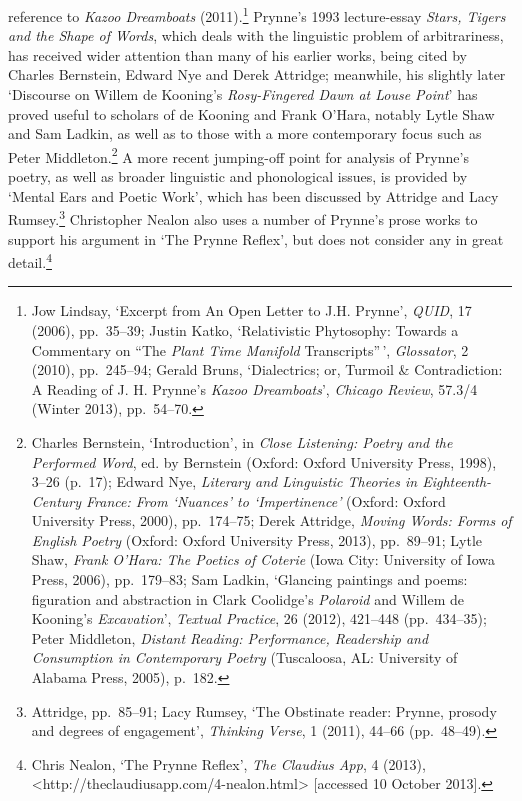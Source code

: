 \documentclass[]{article}
\begin{document}
reference to \emph{Kazoo Dreamboats} (2011).\footnote{Jow Lindsay,
  `Excerpt from An Open Letter to J.H. Prynne', \emph{QUID}, 17 (2006),
  pp.~35--39; Justin Katko, `Relativistic Phytosophy: Towards a
  Commentary on ``The \emph{Plant Time Manifold} Transcripts''\,',
  \emph{Glossator}, 2 (2010), pp.~245--94; Gerald Bruns, `Dialectrics;
  or, Turmoil \& Contradiction: A Reading of J. H. Prynne's \emph{Kazoo
  Dreamboats}', \emph{Chicago Review}, 57.3/4 (Winter 2013), pp.~54--70.}
Prynne's 1993 lecture-essay \emph{Stars, Tigers and the Shape of Words},
which deals with the linguistic problem of arbitrariness, has received
wider attention than many of his earlier works, being cited by Charles
Bernstein, Edward Nye and Derek Attridge; meanwhile, his slightly later
`Discourse on Willem de Kooning's \emph{Rosy-Fingered Dawn at Louse
Point}' has proved useful to scholars of de Kooning and Frank O'Hara,
notably Lytle Shaw and Sam Ladkin, as well as to those with a more
contemporary focus such as Peter Middleton.\footnote{Charles Bernstein,
  `Introduction', in \emph{Close Listening: Poetry and the Performed
  Word}, ed. by Bernstein (Oxford: Oxford University Press, 1998), 3--26
  (p.~17); Edward Nye, \emph{Literary and Linguistic Theories in
  Eighteenth-Century France: From `Nuances' to `Impertinence'} (Oxford:
  Oxford University Press, 2000), pp.~174--75; Derek Attridge,
  \emph{Moving Words: Forms of English Poetry} (Oxford: Oxford
  University Press, 2013), pp.~89--91; Lytle Shaw, \emph{Frank O'Hara:
  The Poetics of Coterie} (Iowa City: University of Iowa Press, 2006),
  pp.~179--83; Sam Ladkin, `Glancing paintings and poems: figuration and
  abstraction in Clark Coolidge's \emph{Polaroid} and Willem de
  Kooning's \emph{Excavation}', \emph{Textual Practice}, 26 (2012),
  421--448 (pp.~434--35); Peter Middleton, \emph{Distant Reading:
  Performance, Readership and Consumption in Contemporary Poetry}
  (Tuscaloosa, AL: University of Alabama Press, 2005), p.~182.} A more
recent jumping-off point for analysis of Prynne's poetry, as well as
broader linguistic and phonological issues, is provided by `Mental Ears
and Poetic Work', which has been discussed by Attridge and Lacy
Rumsey.\footnote{Attridge, pp.~85--91; Lacy Rumsey, `The Obstinate
  reader: Prynne, prosody and degrees of engagement', \emph{Thinking
  Verse}, 1 (2011), 44--66 (pp.~48--49).} Christopher Nealon also uses a
number of Prynne's prose works to support his argument in `The Prynne
Reflex', but does not consider any in great detail.\footnote{Chris
  Nealon, `The Prynne Reflex', \emph{The Claudius App}, 4 (2013),
  \textless{}http://theclaudiusapp.com/4-nealon.html\textgreater{}
  {[}accessed 10 October 2013{]}.}
\end{document}

